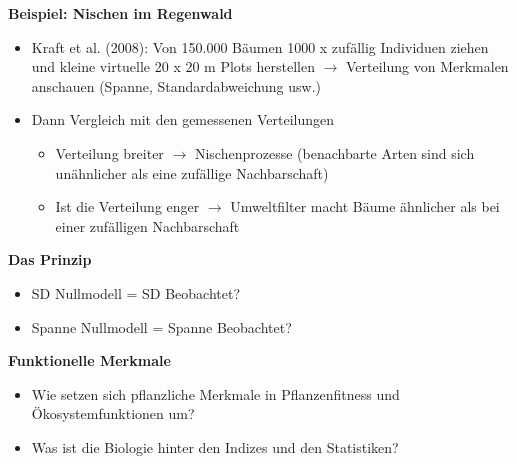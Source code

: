 \newpage
\textbf{Beispiel: Nischen im Regenwald}
\begin{itemize}
	\item Kraft et al. (2008): Von 150.000 Bäumen 1000 x zufällig Individuen ziehen und kleine virtuelle 20 x 20 m Plots herstellen $\rightarrow$ Verteilung von Merkmalen anschauen
(Spanne, Standardabweichung usw.)
	\item Dann Vergleich mit den gemessenen Verteilungen
	\begin{itemize}
		\item Verteilung breiter $\rightarrow$ Nischenprozesse (benachbarte Arten sind sich unähnlicher als eine zufällige Nachbarschaft)
		\item Ist die Verteilung enger $\rightarrow$ Umweltfilter macht Bäume ähnlicher als bei einer zufälligen Nachbarschaft
	\end{itemize}
\end{itemize}

\textbf{Das Prinzip}
\begin{itemize}
	\item SD Nullmodell = SD Beobachtet?
	\item Spanne Nullmodell = Spanne Beobachtet?
\end{itemize}

\textbf{Funktionelle Merkmale}
\begin{itemize}
	\item Wie setzen sich pflanzliche Merkmale in Pflanzenfitness und Ökosystemfunktionen um?
	\item Was ist die Biologie hinter den Indizes und den Statistiken?
\end{itemize}